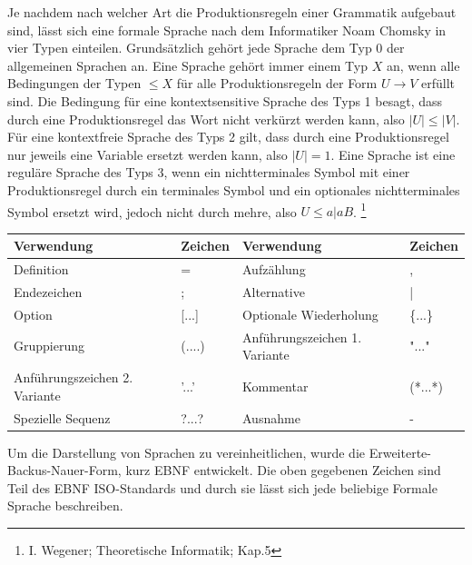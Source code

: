 Je nachdem nach welcher Art die Produktionsregeln einer Grammatik aufgebaut sind, lässt sich eine formale Sprache nach dem Informatiker Noam Chomsky in vier Typen einteilen. Grundsätzlich gehört jede Sprache dem Typ 0 der allgemeinen Sprachen an. Eine Sprache gehört immer einem Typ $X$ an, wenn alle Bedingungen  der Typen $\leq X$ für alle Produktionsregeln der Form $U \rightarrow V$ erfüllt sind. Die Bedingung für eine kontextsensitive Sprache des Typs 1 besagt, dass durch eine Produktionsregel das Wort nicht verkürzt werden kann, also $|U| \leq |V|$. Für eine kontextfreie Sprache des Typs 2 gilt, dass durch eine Produktionsregel nur jeweils eine Variable ersetzt werden kann, also $|U| = 1$. Eine Sprache ist eine reguläre Sprache des Typs 3, wenn ein nichtterminales Symbol mit einer Produktionsregel durch ein terminales Symbol und ein optionales nichtterminales Symbol ersetzt wird, jedoch nicht durch mehre, also $U \leq a|aB$. \footnote{I. Wegener;	Theoretische Informatik; Kap.5}\\
\begin{table}[h!]
\begin{tabular}{|ll|ll|}
\hline
Verwendung                    & Zeichen   & Verwendung                    & Zeichen \\ \hline
Definition                    & =         & Aufzählung                    & ,       \\
Endezeichen                   & ;         & Alternative                   & |       \\
Option                        & {[}...{]} & Optionale Wiederholung        & \{...\} \\
Gruppierung                   & (....)    & Anführungszeichen 1. Variante & "..."   \\
Anführungszeichen 2. Variante & '...'     & Kommentar                      & (*...*) \\
Spezielle Sequenz             & ?...?     & Ausnahme                      & -       \\ \hline
\end{tabular}
\end{table}
Um die Darstellung von Sprachen zu vereinheitlichen, wurde die Erweiterte-Backus-Nauer-Form, kurz EBNF entwickelt. Die oben gegebenen Zeichen sind Teil des EBNF ISO-Standards und durch sie lässt sich jede beliebige Formale Sprache beschreiben.\\

 
